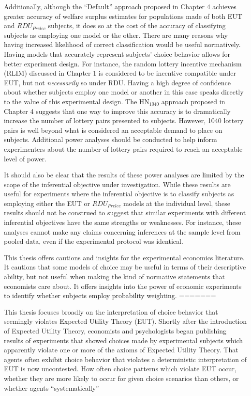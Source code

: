 \documentclass[../main.tex]{subfiles}
\begin{document}
Additionally, although the \enquote{Default} approach proposed in Chapter 4 achieves greater accuracy of welfare surplus estimates for populations made of both EUT and $\mathit{RDU_{Prelec}}$ subjects, it does so at the cost of the accuracy of classifying subjects as employing one model or the other.
There are many reasons why having increased likelihood of correct classification would be useful normatively.
Having models that accurately represent subjects' choice behavior allows for better experiment design.
For instance, the random lottery incentive mechanism (RLIM) discussed in Chapter 1 is considered to be incentive compatible under EUT, but not \textit{necessarily} so under RDU.
Having a high degree of confidence about whether subjects employ one model or another in this case speaks directly to the value of this experimental design.
The $\text{HN}_{1040}$ approach proposed in Chapter 4 suggests that one way to improve this accuracy is to dramatically increase the number of lottery pairs presented to subjects.
However, 1040 lottery pairs is well beyond what is considered an acceptable demand to place on subjects.
Additional power analyses should be conducted to help inform experimenters about the number of lottery pairs required to reach an acceptable level of power.

It should also be clear that the results of these power analyses are limited by the scope of the inferential objective under investigation.
While these results are useful for experiments where the inferential objective is to classify subjects as employing either the EUT or $\mathit{RDU_{Prelec}}$ models at the individual level, these results should not be construed to suggest that similar experiments with different inferential objectives have the same strengths or weaknesses.
For instance, these analyses cannot make any claims concerning inferences at the sample level from pooled data, even if the experimental protocol was identical.

This thesis offers cautions and insights for the experimental economics literature.
It cautions that some models of choice may be useful in terms of their descriptive ability, but not useful when making the kind of normative statements that economists care about.
It offers insights into the power of economic experiments to identify whether subjects employ probability weighting.
=======
\lltoc %

This thesis focuses broadly on the interpretation of choice behavior that seemingly violates Expected Utility Theory (EUT).
Shortly after the introduction of Expected Utility Theory, economists and psychologists began publishing results of experiments that showed choices made by experimental subjects which apparently violate one or more of the axioms of Expected Utility Theory.
That agents often exhibit choice behavior that violates a deterministic interpretation of EUT is now uncontested.
How often choice patterns which violate EUT occur, whether they are more likely to occur for given choice scenarios than others, or whether agents \enquote{systematically}
\end{document}
